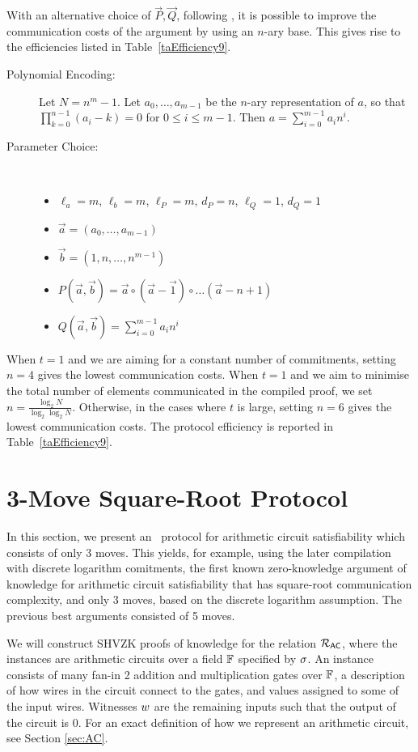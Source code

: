 With an alternative choice of $\vec{P},\vec{Q}$, following \cite{Chaabouni2010}, it is possible to improve the communication costs of the argument by using an $n$-ary base. This gives rise to the efficiencies listed in Table~\ref{taEfficiency9}.
\begin{description}
\item[ Polynomial Encoding: ] Let $N=n^m-1$. Let $a_0,\ldots,a_{m-1}$ be the $n$-ary representation of $a$, so that $\prod_{k=0}^{n-1} (a_i - k) = 0$ for $0 \leq i \leq m-1$. Then $a = \sum_{i=0}^{m-1} a_i n^i$.
\item[ Parameter Choice: ] \ 
\begin{itemize}
\item $\ell_a=m$, $\ell_b=m$, $\ell_P=m$, $d_P=n$, $\ell_Q=1$, $d_Q=1$ 
\item $\vec{a} = (a_0,\ldots,a_{m-1})$
\item $\vec{b} = (1,n,\ldots,n^{m-1})$
\item $P(\vec{a},\vec{b}) = \vec{a} \circ ( \vec{a}-\vec{1} ) \circ \ldots ( \vec{a} - n+1 ) $
\item $Q(\vec{a},\vec{b}) = \sum_{i=0}^{m-1} a_i n^i$
\end{itemize}
\end{description}

When $t=1$ and we are aiming for a constant number of commitments, setting $n=4$ gives the lowest communication costs. When $t=1$ and we aim to minimise the total number of elements communicated in the compiled proof, we set $n = \frac{\log_2N}{\log_2 \log_2 N}$. Otherwise, in the cases where $t$ is large, setting $n=6$ gives the lowest communication costs. The protocol efficiency is reported in Table~\ref{taEfficiency9}.

\section{3-Move Square-Root Protocol} \label{subsec:3rndsqrt}

In this section, we present an \ILC\ protocol for arithmetic circuit satisfiability which consists of only 3 moves. This yields, for example, using the later compilation with discrete logarithm comitments, the first known zero-knowledge argument of knowledge for arithmetic circuit satisfiability that has square-root communication complexity, and only 3 moves, based on the discrete logarithm assumption. The previous best arguments \cite{Seo2011a,Groth2009b} consisted of 5 moves.

We will construct SHVZK proofs of knowledge for the relation $\mathcal{R}_{\mathsf{AC}}$, where the instances are arithmetic circuits over a field $\mathbb{F}$ specified by $\mathsf{\sigma}$. An instance consists of many fan-in 2 addition and multiplication gates over $\mathbb{F}$, a description of how wires in the circuit connect to the gates, and values assigned to some of the input wires. Witnesses $w$ are the remaining inputs such that the output of the circuit is $0$. For an exact definition of how we represent an arithmetic circuit, see Section \ref{sec:AC}.

